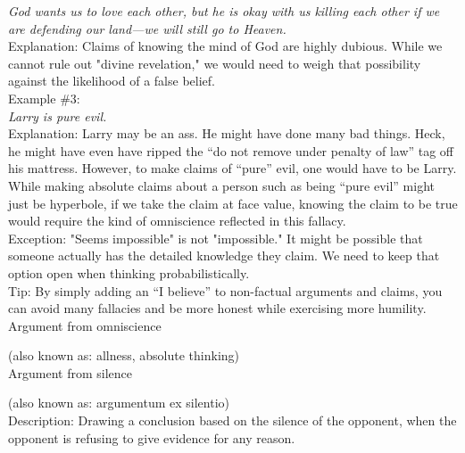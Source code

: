 \documentclass[a4paper,12pt,single,pdftex]{scrartcl}
\begin{document}
    
      {\em God wants us to love each other, but he is okay with us killing each other if we are defending our land—we will still go to Heaven.}
    \\

    
      Explanation: Claims of knowing the mind of God are highly dubious. While we cannot rule out "divine revelation," we would need to weigh that possibility against the likelihood of a false belief.
    \\

    
      Example \#3: 
    \\

    
      {\em Larry is pure evil.}
    \\

    
      Explanation: Larry may be an ass. He might have done many bad things. Heck, he might have even have ripped the “do not remove under penalty of law” tag off his mattress. However, to make claims of “pure” evil, one would have to be Larry. While making absolute claims about a person such as being “pure evil” might just be hyperbole, if we take the claim at face value, knowing the claim to be true would require the kind of omniscience reflected in this fallacy.
    \\

    
      Exception: "Seems impossible" is not "impossible." It might be possible that someone actually has the detailed knowledge they claim. We need to keep that option open when thinking probabilistically.
    \\

    
      Tip: By simply adding an “I believe” to non-factual arguments and claims, you can avoid many fallacies and be more honest while exercising more humility.
    \\

  

Argument from omniscience
    
      (also known as: allness, absolute thinking)
    \\

  

Argument from silence
    
      (also known as: argumentum ex silentio)
    \\

  
    
      Description: Drawing a conclusion based on the silence of the opponent, when the opponent is refusing to give evidence for any reason.
    \\
\end{document}
